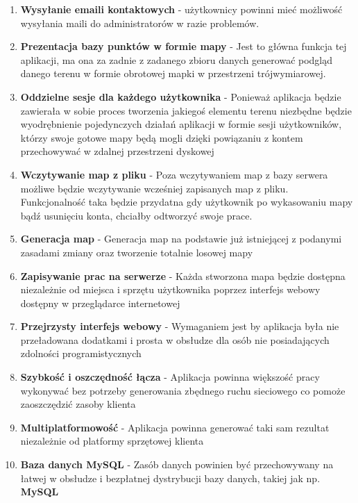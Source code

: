 \begin{enumerate}
\item \textbf{Wysyłanie emaili kontaktowych} - użytkownicy powinni mieć możliwość wysyłania maili do administratorów w razie problemów.

  \item \textbf{Prezentacja bazy punktów w formie mapy} - Jest to główna funkcja tej aplikacji, ma ona za zadnie z zadanego zbioru danych generować podgląd danego terenu w formie obrotowej mapki w przestrzeni trójwymiarowej.

  \item \textbf{Oddzielne sesje dla każdego użytkownika} - Ponieważ aplikacja będzie zawierała w sobie proces tworzenia jakiegoś elementu terenu niezbędne będzie wyodrębnienie pojedynczych działań aplikacji w formie sesji użytkowników, którzy swoje gotowe mapy będą mogli dzięki powiązaniu z kontem przechowywać w zdalnej przestrzeni dyskowej
  
  \item \textbf{Wczytywanie map z pliku} - Poza wczytywaniem map z bazy serwera możliwe będzie wczytywanie wcześniej zapisanych map z pliku. Funkcjonalność taka będzie przydatna gdy użytkownik po wykasowaniu mapy bądź usunięciu konta, chciałby odtworzyć swoje prace.
  
  \item \textbf{Generacja map} - Generacja map na podstawie już istniejącej z podanymi zasadami zmiany oraz tworzenie totalnie losowej mapy
  
  \item \textbf{Zapisywanie prac na serwerze} - Każda stworzona mapa będzie dostępna niezależnie od miejsca i sprzętu użytkownika poprzez interfejs webowy dostępny w przeglądarce internetowej
  
  \item \textbf{Przejrzysty interfejs webowy} - Wymaganiem jest by aplikacja była nie przeładowana dodatkami i prosta w obsłudze dla osób nie posiadających zdolności programistycznych

  \item \textbf{Szybkość i oszczędność łącza} - Aplikacja powinna większość pracy wykonywać bez potrzeby generowania zbędnego ruchu sieciowego co pomoże zaoszczędzić zasoby klienta

  \item \textbf{Multiplatformowość} - Aplikacja powinna generować taki sam rezultat niezależnie od platformy sprzętowej klienta

  \item \textbf{Baza danych MySQL} - Zasób danych powinien być przechowywany na łatwej w obsłudze i bezpłatnej dystrybucji bazy danych, takiej jak np. \textbf{MySQL}
  

\end{enumerate}
